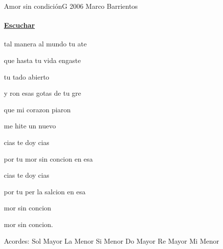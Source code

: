 \documentclass[12pt, spanish]{book}
\begin{document}
    \begin{song}{Amor sin condición}{G}
        {2006} %
        {Marco Barrientos} %
        {} %
        {}
    \ifChordBk
    \paragraph{\mbox{}\hfill\protect\href{https://open.spotify.com/intl-es/track/2iUzMU00x7dXtZVbw9QtIn}{Escuchar}\mbox{}\hfill}
    \fi


    \begin{SBOpGroup}
        tal manera al mundo tu ate

        que hasta tu vida engaste

        tu tado abierto 
    \end{SBOpGroup}

    \begin{SBOpGroup}
        y ron esas gotas de tu gre

        que mi corazon piaron

        me hite un nuevo 
    \end{SBOpGroup}

    \begin{SBChorus}
        cias te doy cias

        por tu mor sin concion en esa 

        cias te doy cias

        por tu per la salcion en esa 
    \end{SBChorus}

    \begin{SBOpGroup}
        mor sin concion

        mor sin concion.
    \end{SBOpGroup}

    \ifChordBk
    \begin{SBOpGroup}
        Acordes:\break
        \upchord{\G}\qquad Sol Mayor \hfill
        \upchord{\Am}\qquad La Menor \hfill\null\break
        \upchord{\Bm}\qquad Si Menor \hfill
        \upchord{\C}\qquad Do Mayor \hfill\null\break
        \upchord{\D}\qquad Re Mayor \hfill
        \upchord{\Em}\qquad Mi Menor \hfill\null\break
    \end{SBOpGroup}
    \fi
    \end{song}
\end{document}
